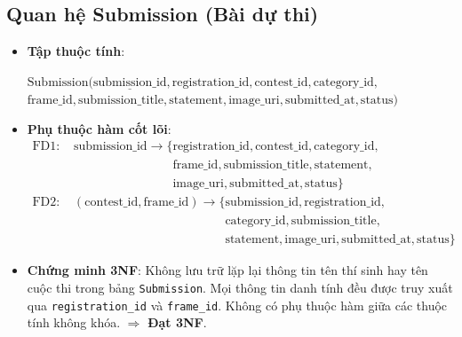 \subsection{Quan hệ Submission (Bài dự thi)}
\begin{itemize}
    \item \textbf{Tập thuộc tính}: 
    \begin{center}
    $\text{Submission}(\underline{\text{submission\_id}}, \text{registration\_id}, \text{contest\_id}, \text{category\_id},$ \\
    $\text{frame\_id}, \text{submission\_title}, \text{statement}, \text{image\_uri}, \text{submitted\_at}, \text{status})$
    \end{center}
    \item \textbf{Phụ thuộc hàm cốt lõi}:
    \begin{align*}
        \text{FD1: } & \text{submission\_id} \longrightarrow \{\text{registration\_id}, \text{contest\_id}, \text{category\_id}, \\
        & \phantom{\text{submission\_id} \longrightarrow \{} \text{frame\_id}, \text{submission\_title}, \text{statement}, \\
        & \phantom{\text{submission\_id} \longrightarrow \{} \text{image\_uri}, \text{submitted\_at}, \text{status}\} \\
        \text{FD2: } & (\text{contest\_id}, \text{frame\_id}) \longrightarrow \{\text{submission\_id}, \text{registration\_id}, \\
        & \phantom{(\text{contest\_id}, \text{frame\_id}) \longrightarrow \{} \text{category\_id}, \text{submission\_title}, \\
        & \phantom{(\text{contest\_id}, \text{frame\_id}) \longrightarrow \{} \text{statement}, \text{image\_uri}, \text{submitted\_at}, \text{status}\}
    \end{align*}
    \item \textbf{Chứng minh 3NF}: Không lưu trữ lặp lại thông tin tên thí sinh hay tên cuộc thi trong bảng \texttt{Submission}. Mọi thông tin danh tính đều được truy xuất qua \texttt{registration\_id} và \texttt{frame\_id}. Không có phụ thuộc hàm giữa các thuộc tính không khóa. $\Rightarrow$ \textbf{Đạt 3NF}.
\end{itemize}


